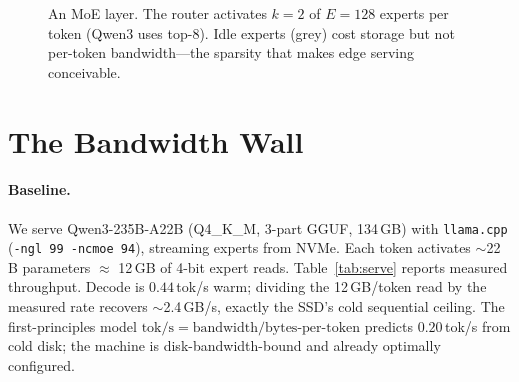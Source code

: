 \documentclass[11pt]{article}
\newcommand{\tps}{tok/s}
\newcommand{\num}[1]{\ensuremath{#1}}
\begin{document}
\begin{figure}[t]\centering
{}
\caption{An MoE layer. The router activates $k{=}2$ of $E{=}128$ experts per
token (Qwen3 uses top-8). Idle experts (grey) cost storage but not per-token
bandwidth---the sparsity that makes edge serving conceivable.}
\label{fig:moe}
\end{figure}

\section{The Bandwidth Wall}
\label{sec:wall}
\paragraph{Baseline.}
We serve Qwen3-235B-A22B (Q4\_K\_M, 3-part GGUF, 134\,GB) with
\texttt{llama.cpp} (\texttt{-ngl 99 -ncmoe 94}), streaming experts from NVMe.
Each token activates $\sim$22\,B parameters $\approx$ 12\,GB of 4-bit expert
reads. Table~\ref{tab:serve} reports measured throughput. Decode is
\num{0.44}\,\tps{} warm; dividing the 12\,GB/token read by the measured rate
recovers $\sim$2.4\,GB/s, exactly the SSD's cold sequential ceiling. The
first-principles model $\text{tok/s} = \text{bandwidth}/\text{bytes-per-token}$
predicts \num{0.20}\,\tps{} from cold disk; the machine is disk-bandwidth-bound
and already optimally configured.
\end{document}
